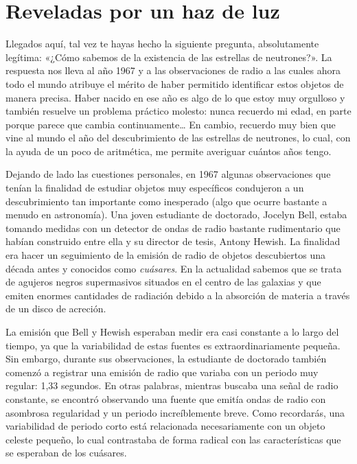 \section{Reveladas por un haz de luz}\label{sec:05-pulsars}

Llegados aquí, tal vez te hayas hecho la siguiente pregunta, absolutamente legítima: «¿Cómo sabemos de la existencia de las estrellas de neutrones?». La respuesta nos lleva al año 1967 y a las observaciones de radio a las cuales ahora todo el mundo atribuye el mérito de haber permitido identificar estos objetos de manera precisa. Haber nacido en ese año es algo de lo que estoy muy orgulloso y también resuelve un problema práctico molesto: nunca recuerdo mi edad, en parte porque parece que cambia continuamente… En cambio, recuerdo muy bien que vine al mundo el año del descubrimiento de las estrellas de neutrones, lo cual, con la ayuda de un poco de aritmética, me permite averiguar cuántos años tengo.

Dejando de lado las cuestiones personales, en 1967 algunas observaciones que tenían la finalidad de estudiar objetos muy específicos condujeron a un descubrimiento tan importante como inesperado (algo que ocurre bastante a menudo en astronomía). Una joven estudiante de doctorado, Jocelyn Bell, estaba tomando medidas con un detector de ondas de radio bastante rudimentario que habían construido entre ella y su director de tesis, Antony Hewish. La finalidad era hacer un seguimiento de la emisión de radio de objetos descubiertos una década antes y conocidos como \emph{cuásares}. En la actualidad sabemos que se trata de agujeros negros supermasivos situados en el centro de las galaxias y que emiten enormes cantidades de radiación debido a la absorción de materia a través de un disco de acreción.

La emisión que Bell y Hewish esperaban medir era casi constante a lo largo del tiempo, ya que la variabilidad de estas fuentes es extraordinariamente pequeña. Sin embargo, durante sus observaciones, la estudiante de doctorado también comenzó a registrar una emisión de radio que variaba con un periodo muy regular: 1,33 segundos. En otras palabras, mientras buscaba una señal de radio constante, se encontró observando una fuente que emitía ondas de radio con asombrosa regularidad y un periodo increíblemente breve. Como recordarás, una variabilidad de periodo corto está relacionada necesariamente con un objeto celeste pequeño, lo cual contrastaba de forma radical con las características que se esperaban de los cuásares.


